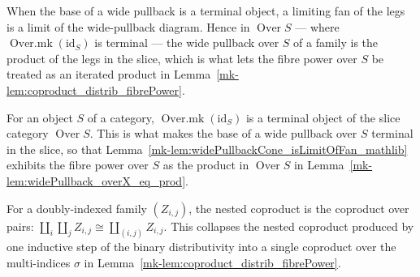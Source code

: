 \begin{lemma}
  \label{mk-lem:widePullbackCone_isLimitOfFan_mathlib}
  \mathlibok

  When the base of a wide pullback is a terminal object, a limiting fan of the legs is a limit of
  the wide-pullback diagram. Hence in \(\operatorname{Over} S\) --- where \(\operatorname{Over.mk}
  (\mathrm{id}_S)\) is terminal --- the wide pullback over \(S\) of a family is the product of the
  legs in the slice, which is what lets the fibre power over \(S\) be treated as an iterated
  product in Lemma~\ref{mk-lem:coproduct_distrib_fibrePower}.
\end{lemma}

\begin{lemma}
  \label{mk-lem:over_mkIdTerminal_mathlib}
  \mathlibok

  For an object \(S\) of a category, \(\operatorname{Over.mk}(\mathrm{id}_S)\) is a terminal object
  of the slice category \(\operatorname{Over} S\). This is what makes the base of a wide pullback
  over \(S\) terminal in the slice, so that
  Lemma~\ref{mk-lem:widePullbackCone_isLimitOfFan_mathlib} exhibits the fibre power over \(S\) as the
  product in \(\operatorname{Over} S\) in Lemma~\ref{mk-lem:widePullback_overX_eq_prod}.
\end{lemma}

\begin{lemma}
  \label{mk-lem:sigmaSigmaIso_mathlib}
  \mathlibok

  For a doubly-indexed family \((Z_{i,j})\), the nested coproduct is the coproduct over pairs:
  \(\coprod_i \coprod_j Z_{i,j} \cong \coprod_{(i,j)} Z_{i,j}\). This collapses the nested
  coproduct produced by one inductive step of the binary distributivity into a single coproduct
  over the multi-indices \(\sigma\) in Lemma~\ref{mk-lem:coproduct_distrib_fibrePower}.
\end{lemma}

